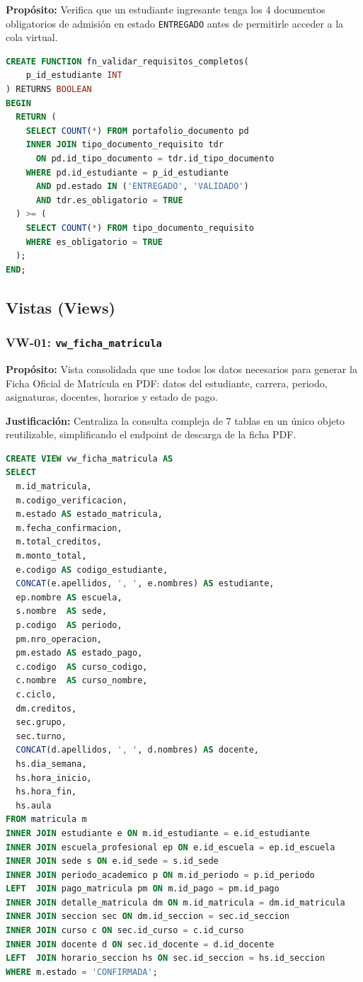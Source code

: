 \documentclass[12pt,a4paper]{article}
\begin{document}
\textbf{Prop\'osito:} Verifica que un estudiante ingresante tenga los 4 documentos obligatorios de admisi\'on en estado \texttt{ENTREGADO} antes de permitirle acceder a la cola virtual.

\begin{lstlisting}[language=SQL, caption={Implementacion de fn\_validar\_requisitos\_completos}]
CREATE FUNCTION fn_validar_requisitos_completos(
    p_id_estudiante INT
) RETURNS BOOLEAN
BEGIN
  RETURN (
    SELECT COUNT(*) FROM portafolio_documento pd
    INNER JOIN tipo_documento_requisito tdr
      ON pd.id_tipo_documento = tdr.id_tipo_documento
    WHERE pd.id_estudiante = p_id_estudiante
      AND pd.estado IN ('ENTREGADO', 'VALIDADO')
      AND tdr.es_obligatorio = TRUE
  ) >= (
    SELECT COUNT(*) FROM tipo_documento_requisito
    WHERE es_obligatorio = TRUE
  );
END;
\end{lstlisting}

\subsection{Vistas (Views)}

\subsubsection{VW-01: \texttt{vw\_ficha\_matricula}}

\textbf{Prop\'osito:} Vista consolidada que une todos los datos necesarios para generar la Ficha Oficial de Matr\'icula en PDF: datos del estudiante, carrera, periodo, asignaturas, docentes, horarios y estado de pago.

\textbf{Justificaci\'on:} Centraliza la consulta compleja de 7 tablas en un \'unico objeto reutilizable, simplificando el endpoint de descarga de la ficha PDF.

\begin{lstlisting}[language=SQL, caption={Estructura de vw\_ficha\_matricula}]
CREATE VIEW vw_ficha_matricula AS
SELECT
  m.id_matricula,
  m.codigo_verificacion,
  m.estado AS estado_matricula,
  m.fecha_confirmacion,
  m.total_creditos,
  m.monto_total,
  e.codigo AS codigo_estudiante,
  CONCAT(e.apellidos, ', ', e.nombres) AS estudiante,
  ep.nombre AS escuela,
  s.nombre  AS sede,
  p.codigo  AS periodo,
  pm.nro_operacion,
  pm.estado AS estado_pago,
  c.codigo  AS curso_codigo,
  c.nombre  AS curso_nombre,
  c.ciclo,
  dm.creditos,
  sec.grupo,
  sec.turno,
  CONCAT(d.apellidos, ', ', d.nombres) AS docente,
  hs.dia_semana,
  hs.hora_inicio,
  hs.hora_fin,
  hs.aula
FROM matricula m
INNER JOIN estudiante e ON m.id_estudiante = e.id_estudiante
INNER JOIN escuela_profesional ep ON e.id_escuela = ep.id_escuela
INNER JOIN sede s ON e.id_sede = s.id_sede
INNER JOIN periodo_academico p ON m.id_periodo = p.id_periodo
LEFT  JOIN pago_matricula pm ON m.id_pago = pm.id_pago
INNER JOIN detalle_matricula dm ON m.id_matricula = dm.id_matricula
INNER JOIN seccion sec ON dm.id_seccion = sec.id_seccion
INNER JOIN curso c ON sec.id_curso = c.id_curso
INNER JOIN docente d ON sec.id_docente = d.id_docente
LEFT  JOIN horario_seccion hs ON sec.id_seccion = hs.id_seccion
WHERE m.estado = 'CONFIRMADA';
\end{lstlisting}
\end{document}
